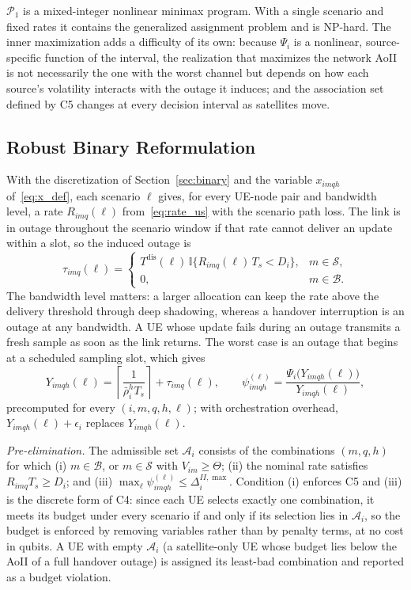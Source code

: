 $\mathscr{P}_{1}$ is a mixed-integer nonlinear minimax program. With a single scenario and fixed rates it contains the
generalized assignment problem and is NP-hard. The inner maximization adds a difficulty of its own: because $\Psi_i$
is a nonlinear, source-specific function of the interval, the realization that maximizes the network AoII is not
necessarily the one with the worst channel but depends on how each source's volatility interacts with the outage it
induces; and the association set defined by C5 changes at every decision interval as satellites move.

\subsection{Robust Binary Reformulation}
\label{sec:reform}

With the discretization of Section~\ref{sec:binary} and the variable $x_{imqh}$ of~\eqref{eq:x_def}, each scenario $\ell$ gives,
for every UE-node pair and bandwidth level, a rate $R_{imq}(\ell)$ from~\eqref{eq:rate_us} with the scenario path
loss. The link is in outage throughout the scenario window if that rate cannot deliver an update within a slot, so the
induced outage is
\begin{equation}
    \tau_{imq}(\ell)=
    \begin{cases}
        T^{\mathrm{dis}}(\ell)\,\mathbb{I}\bigl\{R_{imq}(\ell)\,T_s<D_i\bigr\}, & m\in\mathscr{S},\\
        0, & m\in\mathscr{B}.
    \end{cases}
    \label{eq:tau_out}
\end{equation}
The bandwidth level matters: a larger allocation can keep the rate above the delivery threshold through deep
shadowing, whereas a handover interruption is an outage at any bandwidth. A UE whose update fails during an outage
transmits a fresh sample as soon as the link returns. The worst case is an outage that begins at a scheduled sampling
slot, which gives
\begin{equation}
    Y_{imqh}(\ell)=\left\lceil\frac{1}{\bar\rho_i^{h}T_s}\right\rceil+\tau_{imq}(\ell),\qquad
    \psi_{imqh}^{(\ell)}=\frac{\Psi_{i}\bigl(Y_{imqh}(\ell)\bigr)}{Y_{imqh}(\ell)},
    \label{eq:psi_imqh}
\end{equation}
precomputed for every $(i,m,q,h,\ell)$; with orchestration overhead, $Y_{imqh}(\ell)+\epsilon_i$ replaces
$Y_{imqh}(\ell)$.

\emph{Pre-elimination.} The admissible set $\mathscr{A}_i$ consists of the combinations $(m,q,h)$ for which (i)
$m\in\mathscr{B}$, or $m\in\mathscr{S}$ with $V_{im}\geq\Theta$; (ii) the nominal rate satisfies
$R_{imq}T_s\geq D_i$; and (iii) $\max_{\ell}\psi^{(\ell)}_{imqh}\leq\Delta_i^{II,\max}$. Condition (i) enforces C5
and (iii) is the discrete form of C4: since each UE selects exactly one combination, it meets its budget under every
scenario if and only if its selection lies in $\mathscr{A}_i$, so the budget is enforced by removing variables rather
than by penalty terms, at no cost in qubits. A UE with empty $\mathscr{A}_i$ (a satellite-only UE whose budget lies
below the AoII of a full handover outage) is assigned its least-bad combination and reported as a budget violation.

